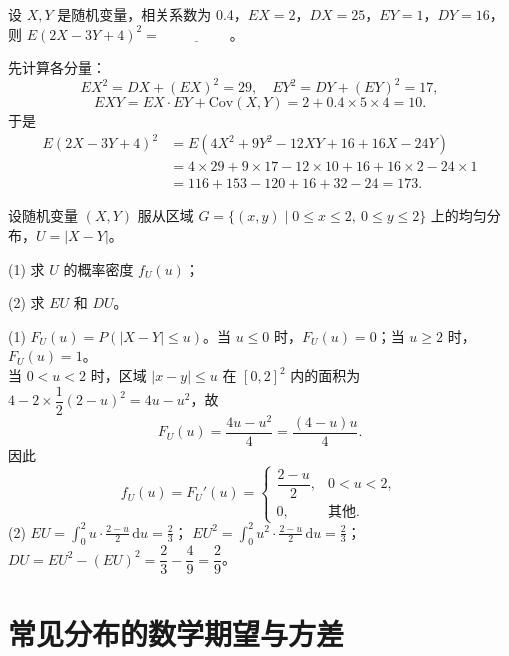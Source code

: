 ﻿\documentclass[lang=cn,11pt]{elegantbook}
\begin{document}
\begin{exercise}\label{exer:4-7-square}
设 \(X, Y\) 是随机变量，相关系数为 0.4，\(EX = 2\)，\(DX = 25\)，\(EY = 1\)，\(DY = 16\)，则 \(E(2X - 3Y + 4)^2 =\,\underline{\hspace{2cm}}\)。
\end{exercise}

\begin{solution}
先计算各分量：
\[
EX^2 = DX + (EX)^2 = 29,\quad EY^2 = DY + (EY)^2 = 17,
\]
\[
EXY = EX \cdot EY + \mathrm{Cov}(X,Y) = 2 + 0.4 \times 5 \times 4 = 10.
\]
于是
\[
\begin{aligned}
E(2X-3Y+4)^2 &= E(4X^2 + 9Y^2 - 12XY + 16 + 16X - 24Y) \\
&= 4 \times 29 + 9 \times 17 - 12 \times 10 + 16 + 16 \times 2 - 24 \times 1 \\
&= 116 + 153 - 120 + 16 + 32 - 24 = 173.
\end{aligned}
\]
\end{solution}


\begin{exercise}\label{exer:4-3-abs}
设随机变量 \((X,Y)\) 服从区域 \(G = \{(x,y) \mid 0 \leqslant x \leqslant 2,\ 0 \leqslant y \leqslant 2\}\) 上的均匀分布，\(U = |X-Y|\)。\par
(1) 求 \(U\) 的概率密度 \(f_U(u)\)；\par
(2) 求 \(EU\) 和 \(DU\)。
\end{exercise}
\begin{solution}
(1) \(F_U(u) = P(|X-Y| \leqslant u)\)。当 \(u \leqslant 0\) 时，\(F_U(u) = 0\)；当 \(u \geqslant 2\) 时，\(F_U(u) = 1\)。\\
当 \(0 < u < 2\) 时，区域 \(|x-y| \leqslant u\) 在 \([0,2]^2\) 内的面积为 \(4 - 2 \times \dfrac{1}{2}(2-u)^2 = 4u - u^2\)，故
\[
F_U(u) = \frac{4u - u^2}{4} = \frac{(4-u)u}{4}.
\]
因此
\[
f_U(u) = F_U'(u) = \begin{cases} \dfrac{2-u}{2}, & 0 < u < 2, \\[4pt] 0, & \text{其他}. \end{cases}
\]
(2) \(EU = \displaystyle\int_0^2 u \cdot \frac{2-u}{2}\,\mathrm{d}u = \frac{2}{3}\)；
\(EU^2 = \displaystyle\int_0^2 u^2 \cdot \frac{2-u}{2}\,\mathrm{d}u = \frac{2}{3}\)；
\(DU = EU^2 - (EU)^2 = \dfrac{2}{3} - \dfrac{4}{9} = \dfrac{2}{9}\)。
\end{solution}

\section{常见分布的数学期望与方差}
\end{document}
